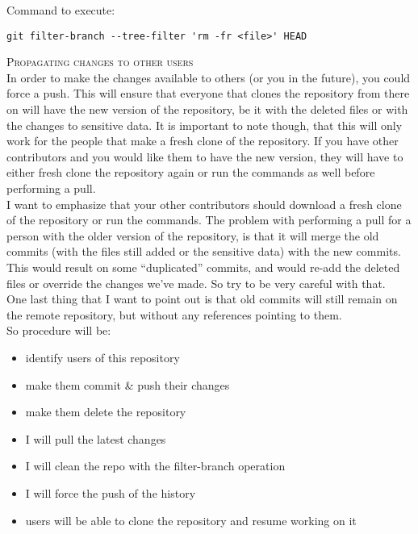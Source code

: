 \documentclass[11pt,twoside,a4paper]{article}
\begin{document}
\begin{landscape}
\begin{multicols}{2}
Command to execute:
	\begin{verbatim}
git filter-branch --tree-filter 'rm -fr <file>' HEAD
	\end{verbatim}

\textsc{Propagating changes to other users}~\\

In order to make the changes available to others (or you in the future), you could force a push. This will ensure that everyone that clones the repository from there on will have the new version of the repository, be it with the deleted files or with the changes to sensitive data. It is important to note though, that this will only work for the people that make a fresh clone of the repository. If you have other contributors and you would like them to have the new version, they will have to either fresh clone the repository again or run the commands as well before performing a pull.~\\

I want to emphasize that your other contributors should download a fresh clone of the repository or run the commands. The problem with performing a pull for a person with the older version of the repository, is that it will merge the old commits (with the files still added or the sensitive data) with the new commits. This would result on some “duplicated” commits, and would re-add the deleted files or override the changes we’ve made. So try to be very careful with that.~\\

One last thing that I want to point out is that old commits will still remain on the remote repository, but without any references pointing to them.~\\

So procedure will be:
\begin{itemize}
	\item identify users of this repository
	\item make them commit \& push their changes
	\item make them delete the repository
	\item I will pull the latest changes
	\item I will clean the repo with the filter-branch operation
	\item I will force the push of the history
	\item users will be able to clone the repository and resume working on it
\end{itemize}~\\


\end{multicols}
\end{landscape}
\end{document}
